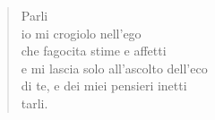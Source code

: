 
\begin{verse}
    Parli\\
    io mi crogiolo nell'ego\\
    che fagocita stime e affetti\\
    e mi lascia solo all'ascolto dell'eco\\
    di te, e dei miei pensieri inetti\\
    tarli.
\end{verse}